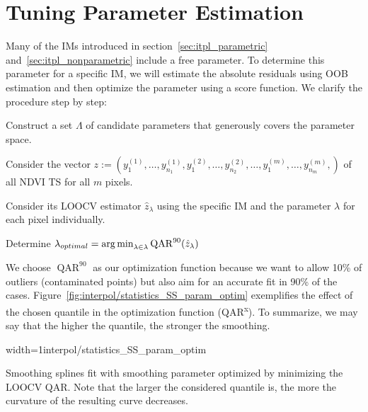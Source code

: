 \section{Tuning Parameter Estimation}{ \label{sec:itpl_param_est}
	Many of the {{IM}}s introduced in section~\ref{sec:itpl_parametric} and~\ref{sec:itpl_nonparametric} include a free parameter. To determine this parameter for a specific {{IM}}, we will estimate the absolute residuals using OOB estimation and then optimize the parameter using a score function. We clarify the procedure step by step:	
	\begin{Nenumerate}
		\item Construct a set $\Lambda$ of candidate parameters that generously covers the parameter space.
		\item Consider the vector $z:=(y_1^{(1)},\dots,y_{n_1}^{(1)},y_1^{(2)},\dots,y_{n_2}^{(2)},\dots,y_1^{(m)},\dots,y_{n_m}^{(m)},)$ of all NDVI TS for all $m$ pixels.
		\item Consider its LOOCV estimator $\hat z_\lambda$ using the specific IM and the parameter $\lambda$ for each pixel individually.
		\item Determine $\lambda_{optimal} = \operatorname*{arg\, min}_{\lambda\in\lambda}\operatorname{QAR}^{90}(\hat z_\lambda)$
	\end{Nenumerate}
	We choose $\operatorname{QAR}^{90}$ as our optimization function because we want to allow 10\% of outliers (contaminated points) but also aim for an accurate fit in 90\% of the cases.  
	Figure~\ref{fig:interpol/statistics_SS_param_optim} exemplifies the effect of the chosen quantile in the optimization function (QAR\textsuperscript{x}). To summarize, we may say that the higher the quantile, the stronger the smoothing. 

	\begin{my_figure}[h]{width=1\textwidth}{interpol/statistics_SS_param_optim}
		\caption[Smoothing splines optimized by minimizing the given quantile of the absolute leave-one-out residuals]{Smoothing splines fit with smoothing parameter optimized by minimizing the LOOCV QAR. Note that the larger the considered quantile is, the more the curvature of the resulting curve decreases.}
		\label{fig:interpol/statistics_SS_param_optim}
	\end{my_figure}

}


